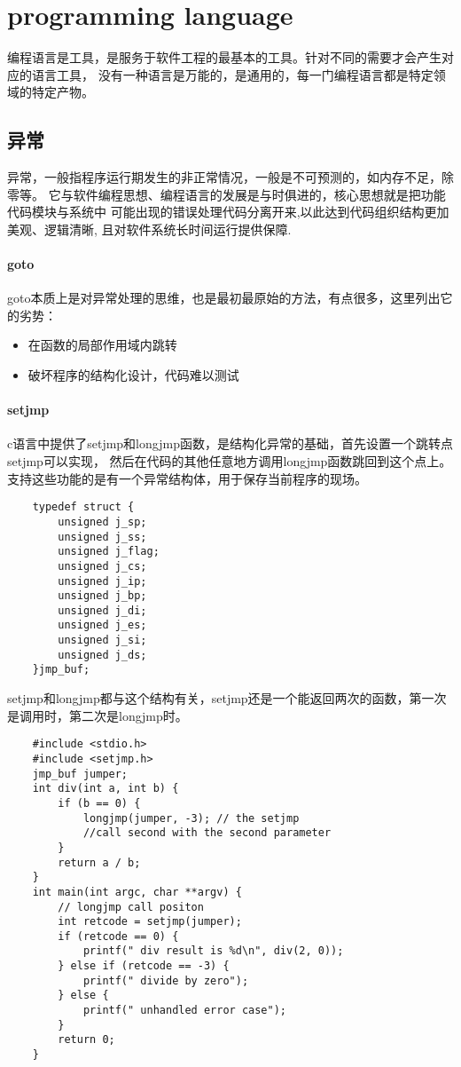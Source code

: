 \chapter{programming language}
编程语言是工具，是服务于软件工程的最基本的工具。针对不同的需要才会产生对应的语言工具，
没有一种语言是万能的，是通用的，每一门编程语言都是特定领域的特定产物。

\section{异常}
异常，一般指程序运行期发生的非正常情况，一般是不可预测的，如内存不足，除零等。
它与软件编程思想、编程语言的发展是与时俱进的，核心思想就是把功能代码模块与系统中
可能出现的错误处理代码分离开来,以此达到代码组织结构更加美观、逻辑清晰,
且对软件系统长时间运行提供保障.

\subsubsection{goto}
goto本质上是对异常处理的思维，也是最初最原始的方法，有点很多，这里列出它的劣势：
\begin{itemize}
    \item {在函数的局部作用域内跳转}
    \item {破坏程序的结构化设计，代码难以测试}
\end{itemize}

\subsubsection{setjmp}
c语言中提供了setjmp和longjmp函数，是结构化异常的基础，首先设置一个跳转点setjmp可以实现，
然后在代码的其他任意地方调用longjmp函数跳回到这个点上。
\newline
支持这些功能的是有一个异常结构体，用于保存当前程序的现场。
\begin{lstlisting}
    typedef struct {
        unsigned j_sp;
        unsigned j_ss;
        unsigned j_flag;
        unsigned j_cs;
        unsigned j_ip;
        unsigned j_bp;
        unsigned j_di;
        unsigned j_es;
        unsigned j_si;
        unsigned j_ds;
    }jmp_buf;
\end{lstlisting}
setjmp和longjmp都与这个结构有关，setjmp还是一个能返回两次的函数，第一次是调用时，第二次是longjmp时。
\begin{lstlisting}
    #include <stdio.h>
    #include <setjmp.h>
    jmp_buf jumper;
    int div(int a, int b) {
        if (b == 0) {
            longjmp(jumper, -3); // the setjmp 
            //call second with the second parameter
        }
        return a / b;
    }
    int main(int argc, char **argv) {
        // longjmp call positon 
        int retcode = setjmp(jumper); 
        if (retcode == 0) {
            printf(" div result is %d\n", div(2, 0));
        } else if (retcode == -3) {
            printf(" divide by zero");
        } else {
            printf(" unhandled error case");
        }
        return 0;
    }
\end{lstlisting}

